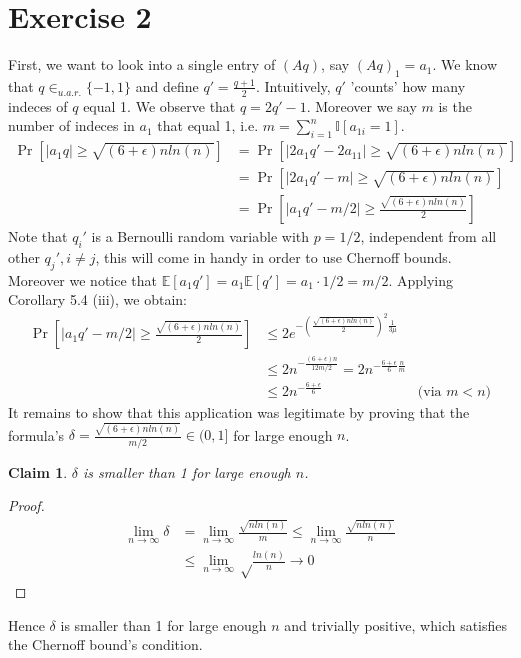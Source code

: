 \documentclass[a4paper,german]{article}
\newtheorem{claim}{Claim}
\newcommand{\E}{\mathbb{E}}
\begin{document}
\section*{Exercise 2}
First, we want to look into a single entry of \((Aq)\), say \((Aq)_1 = a_1\). We know that \(q \in_{u.a.r.} \{-1,1\}\) and define \(q' = \frac{q+1}{2}\). Intuitively, \(q'\) 'counts' how many indeces of \(q\) equal 1. We observe that \(q = 2q' - 1\).  Moreover we say \(m\) is the number of indeces in \(a_1\) that equal 1, i.e. \(m = \sum_{i=1}^n \mathbb{I}[a_{1i} = 1] \).
\begin{align*}
\Pr[|a_1q| \geq \sqrt {(6+\epsilon)nln(n)} ] &= \Pr[|2a_1q' - 2a_11| \geq \sqrt {(6+\epsilon)nln(n)} ] \\
 &= \Pr[|2a_1q' - m| \geq \sqrt {(6+\epsilon)nln(n)} ] \\
  &= \Pr[|a_1q' - m/2| \geq \frac{\sqrt {(6+\epsilon)nln(n)}}{2} ]
\end{align*}
Note that \(q_i'\) is a Bernoulli random variable with \(p = 1/2\), independent from all other \(q_j', i \neq j\), this will come in handy in order to use Chernoff bounds. Moreover we notice that \(\E[a_1q'] = 
a_1 \E[q'] = a_1 \cdot 1/2 = m/2 \).  Applying Corollary 5.4 (iii), we obtain:
\begin{align*}
 \Pr[|a_1q' - m/2| \geq \frac{\sqrt {(6+\epsilon)nln(n)}}{2} ] &\leq 2 e^{-(\frac{\sqrt {(6+\epsilon)nln(n)}}{2})^2 \frac{1}{3 \mu }} \\
 & \leq 2 n^{-\frac{(6+\epsilon)n}{12 m /2}} =  2 n^{-\frac{6+\epsilon}{6} \frac{n}{m}} \\
 & \leq 2 n^{-\frac{6+\epsilon}{6}} & \text{(via } m < n \text{)}
\end{align*}
It remains to show that this application was legitimate by proving that the formula's \(\delta = \frac{\sqrt {(6+\epsilon)nln(n)}}{m/2}  \in (0,1] \) for large enough \(n\). 
\begin{claim} \(\delta\) is smaller than 1 for large enough \(n\). \end{claim}
\begin{proof}
\begin{align*}
\lim_{n \to \infty} \delta &= \lim_{n \to \infty} \frac{\sqrt {nln(n)}}{m}  \leq \lim_{n \to \infty} \frac{\sqrt {nln(n)}}{n}  \\
& \leq \lim_{n \to \infty} \sqrt \frac{ {ln(n)}}{n}  \to 0
\end{align*}
\end{proof}
Hence \(\delta\) is smaller than 1 for large enough \(n\) and trivially positive, which satisfies the Chernoff bound's condition.
\end{document}
